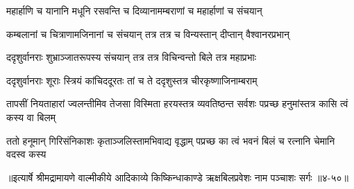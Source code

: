 \twolineshloka
{महार्हाणि च यानानि मधूनि रसवन्ति च}
{दिव्यानामम्बराणां च महार्हाणां च संचयान्} %

\twolineshloka
{कम्बलानां च चित्राणामजिनानां च संचयान्}
{तत्र तत्र च विन्यस्तान् दीप्तान् वैश्वानरप्रभान्} %

\twolineshloka
{ददृशुर्वानराः शुभ्राञ्जातरूपस्य संचयान्}
{तत्र तत्र विचिन्वन्तो बिले तत्र महाप्रभाः} %

\twolineshloka
{ददृशुर्वानराः शूराः स्त्रियं कांचिददूरतः}
{तां च ते ददृशुस्तत्र चीरकृष्णाजिनाम्बराम्} %

\threelineshloka
{तापसीं नियताहारां ज्वलन्तीमिव तेजसा}
{विस्मिता हरयस्तत्र व्यवतिष्ठन्त सर्वशः}
{पप्रच्छ हनुमांस्तत्र कासि त्वं कस्य वा बिलम्} %

\twolineshloka
{ततो हनूमान् गिरिसंनिकाशः कृताञ्जलिस्तामभिवाद्य वृद्धाम्}
{पप्रच्छ का त्वं भवनं बिलं च रत्नानि चेमानि वदस्व कस्य} %


॥इत्यार्षे श्रीमद्रामायणे वाल्मीकीये आदिकाव्ये किष्किन्धाकाण्डे ऋक्षबिलप्रवेशः नाम पञ्चाशः सर्गः ॥४-५०॥
